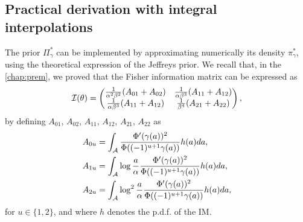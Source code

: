 \subsection{Practical derivation with integral interpolations}\label{sec:constr-frags:subsec-practical-interpol}


The prior $\varPi_\gamma^\ast$ can be implemented by approximating numerically its density $\pi^\ast_\gamma$, using the theoretical expression of the Jeffreys prior.
We recall that, in the \cref{chap:prem}, we proved that %
the Fisher information matrix can be expressed as 
\begin{equation}
        \mathcal{I}(\theta)=\begin{pmatrix}
        \frac{1}{\alpha^2\beta^2}(A_{01} + A_{02}) & \frac{1}{\alpha\beta^3}(A_{11}+A_{12}) \\
        \frac{1}{\alpha\beta^3}(A_{11}+A_{12}) & \frac{1}{\beta^4}(A_{21}+A_{22})
    \end{pmatrix},
    \end{equation}
by defining 
$A_{01}$, $A_{02}$, $A_{11}$, $A_{12}$, $A_{21}$, $A_{22}$ as
    \begin{equation} %
    \begin{aligned}
        A_{0u} &= \int_\cA\frac{\Phi'(\gamma(a))^2}{\Phi((-1)^{u+1}\gamma(a))}h(a)da,\\
        A_{1u} &= \int_\cA\log\frac{a}{\alpha}\frac{\Phi'(\gamma(a))^2}{\Phi((-1)^{u+1}\gamma(a))}h(a)da,\\
        A_{2u} &= \int_\cA\log^2\frac{a}{\alpha}\frac{\Phi'(\gamma(a))^2}{\Phi((-1)^{u+1}\gamma(a))}h(a)da,
    \end{aligned}
    \end{equation}
for $u\in\{1,2\}$, and where $h$ denotes the p.d.f. of the IM.


